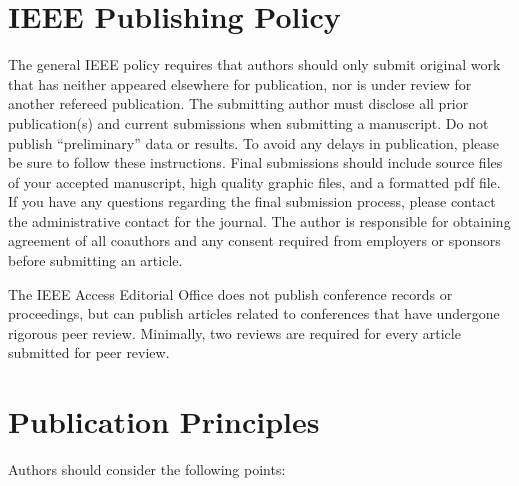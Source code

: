 \documentclass{ieeeaccess}
\begin{document}
\section{IEEE Publishing Policy}
The general IEEE policy requires that authors should only submit original work that has neither appeared elsewhere for publication, nor is under review for another refereed publication. The submitting author must disclose all prior publication(s) and current submissions when submitting a manuscript. Do not publish ``preliminary'' data or results. To avoid any delays in publication, please be sure to follow these instructions. Final submissions should include source files of your accepted manuscript, high quality graphic files, and a formatted pdf file. If you have any questions regarding the final submission process, please contact the administrative contact for the journal. The author is responsible for obtaining agreement of all coauthors and any consent required from employers or sponsors before submitting an article.

The IEEE Access Editorial Office does not publish conference records or proceedings, but can publish articles related to conferences that have undergone rigorous peer review. Minimally, two reviews are required for every article submitted for peer review.

\section{Publication Principles}
Authors should consider the following points:
\end{document}
